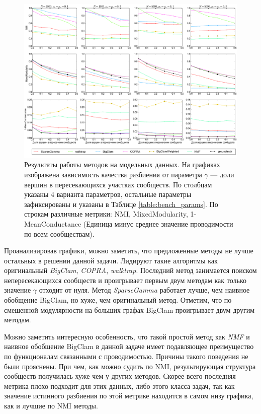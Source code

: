 \documentclass{ITaSconf}
\begin{document}
\begin{figure}[!t]
	\centering
	\includegraphics[width=\textwidth]{imgs/experiments_all.png}
	\caption{Результаты работы методов на модельных данных. На графиках изображена зависимость качества разбиения от параметра $\gamma$ --- доли вершин в пересекающихся участках сообществ. По столбцам указаны 4 варианта параметров, остальные параметры зафиксированы и указаны в Таблице \ref{table:bench_params}. По строкам различные метрики: NMI, MixedModularity, 1-MeanConductance (Единица минус среднее значение проводимости по всем сообществам).}
	\label{fig:experiments}
\end{figure}

Проанализировав графики, можно заметить, что предложенные методы не лучше остальных в решении данной задачи. Лидируют такие алгоритмы как оригинальный \textit{BigClam}, \textit{COPRA}, \textit{walktrap}. Последний метод занимается поиском непересекающихся сообществ и проигрывает первым двум методам как только значение $\gamma$ отходит от нуля.
Метод \textit{SparseGamma} работает лучше, чем наивное обобщение BigClam, но хуже, чем оригинальный метод. 
Отметим, что по смешенной модулярности на больших графах BigClam проигрывает двум другим методам. 

Можно заметить интересную особенность, что такой простой метод как \textit{NMF} и наивное обобщение BigClam в данной задаче имеет подавляющее преимущество по функционалам связанными с проводимостью. Причины такого поведения не были прояснены.
При чем, как можно судить по NMI, результирующая структура сообществ получилась хуже чем у других методов. 
Скорее всего последняя метрика плохо подходит для этих данных, либо этого класса задач, так как значение истинного разбиения по этой метрике находится в самом низу графика, как и лучшие по NMI методы.
\end{document}
